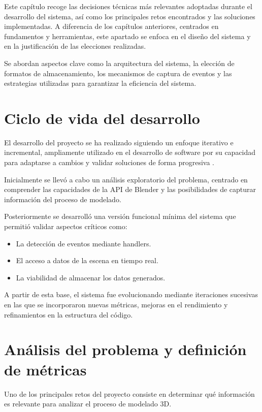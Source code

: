 
Este capítulo recoge las decisiones técnicas más relevantes adoptadas durante el desarrollo del sistema, así como los principales retos encontrados y las soluciones implementadas. A diferencia de los capítulos anteriores, centrados en fundamentos y herramientas, este apartado se enfoca en el diseño del sistema y en la justificación de las elecciones realizadas.

Se abordan aspectos clave como la arquitectura del sistema, la elección de formatos de almacenamiento, los mecanismos de captura de eventos y las estrategias utilizadas para garantizar la eficiencia del sistema.

\section{Ciclo de vida del desarrollo}

El desarrollo del proyecto se ha realizado siguiendo un enfoque iterativo e incremental, ampliamente utilizado en el desarrollo de software por su capacidad para adaptarse a cambios y validar soluciones de forma progresiva \cite{pressman2005}.

Inicialmente se llevó a cabo un análisis exploratorio del problema, centrado en comprender las capacidades de la API de Blender y las posibilidades de capturar información del proceso de modelado.

Posteriormente se desarrolló una versión funcional mínima del sistema que permitió validar aspectos críticos como:
\begin{itemize}
    \item La detección de eventos mediante handlers.
    \item El acceso a datos de la escena en tiempo real.
    \item La viabilidad de almacenar los datos generados.
\end{itemize}

A partir de esta base, el sistema fue evolucionando mediante iteraciones sucesivas en las que se incorporaron nuevas métricas, mejoras en el rendimiento y refinamientos en la estructura del código.

\section{Análisis del problema y definición de métricas}

Uno de los principales retos del proyecto consiste en determinar qué información es relevante para analizar el proceso de modelado 3D.

